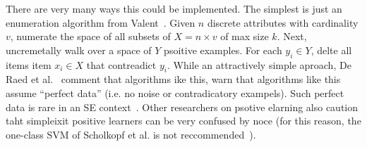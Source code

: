   
  
There are very many ways this could be implemented. The simplest is just an enumeration algorithm from Valent~\cite{xxx}. Given $n$ discrete attributes
with cardinality $v$, numerate the space of all subsets of $X=n{\times}v$ of max size $k$.
Next, uncremetally walk over a space of $Y$ psoitive examples.
For each $y_i \in Y$,
delte all items
  item $x_i \in X$ that contreadict $y_i$.  
     While an attractively simple
     aproach,   De Raed et al.~\cite{de2018learning} comment that algorithms ike this, warn that algorithms like this assume ``perfect data'' (i.e. no noise or contradicatory exampels).
     Such perfect data is rare
     in an SE context~\cite{6464273}. Other researchers on psotive elarning also caution
     taht simpleixit positive learners can be very confused by noce (for this reason,
     the one-class SVM of Scholkopf et al. is not reccommended~\cite{788641}).
  
